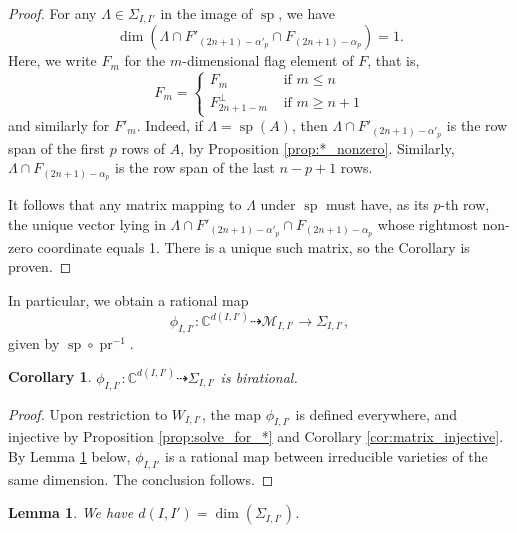 \documentclass[12pt]{amsart}
\newtheorem{corollary}[definition]{Corollary}
\newtheorem{lemma}[definition]{Lemma}
\DeclareMathOperator{\pr}{pr}
\DeclareMathOperator{\ssp}{sp}
\newcommand{\bC}{\mathbb{C}}
\newcommand{\cM}{\mathcal{M}}
\begin{document}
\begin{proof}
    For any $\Lambda\in\Sigma_{I,I'}$ in the image of $\ssp$, we have
    \begin{equation*}
        \dim(\Lambda\cap F'_{(2n+1)-\alpha'_p}\cap F_{(2n+1)-\alpha_p})=1.
    \end{equation*}
    Here, we write $F_m$ for the $m$-dimensional flag element of $F$, that is,
    \begin{equation*}
        F_m=
        \begin{cases}
            F_m&\text{ if }m\le n\\
            F_{2n+1-m}^\perp&\text{ if }m\ge n+1
        \end{cases}
    \end{equation*}
    and similarly for $F'_m$. Indeed, if $\Lambda=\ssp(A)$, then $\Lambda\cap F'_{(2n+1)-\alpha'_p}$ is the row span of the first $p$ rows of $A$, by Proposition \ref{prop:*_nonzero}. Similarly, $\Lambda\cap F_{(2n+1)-\alpha_p}$ is the row span of the last $n-p+1$ rows.

    It follows that any matrix mapping to $\Lambda$ under $\ssp$ must have, as its $p$-th row, the unique vector lying in $\Lambda\cap F'_{(2n+1)-\alpha'_p}\cap F_{(2n+1)-\alpha_p}$ whose rightmost non-zero coordinate equals 1. There is a unique such matrix, so the Corollary is proven.
\end{proof}

In particular, we obtain a rational map
\begin{equation*}
    \phi_{I,I'}:\bC^{d(I,I')}\dashrightarrow \cM_{I,I'}\to \Sigma_{I,I'},
\end{equation*}
given by $\ssp\circ\pr^{-1}$.

\begin{corollary}\label{cor:chart}
$\phi_{I,I'}:\bC^{d(I,I')}\dashrightarrow \Sigma_{I,I'}$ is birational.
\end{corollary}

\begin{proof}
    Upon restriction to $W_{I,I'}$, the map $\phi_{I,I'}$ is defined everywhere, and injective by Proposition \ref{prop:solve_for_*} and Corollary \ref{cor:matrix_injective}. By Lemma \ref{lem:dII'} below, $\phi_{I,I'}$ is a rational map between irreducible varieties of the same dimension. The conclusion follows.
\end{proof}

\begin{lemma}\label{lem:dII'}
We have $d(I,I')=\dim(\Sigma_{I,I'})$.
\end{lemma}
\end{document}
